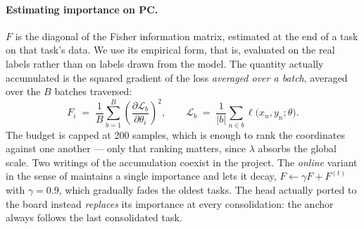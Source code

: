 \paragraph{Estimating importance on PC.} $F$ is the diagonal of the Fisher information matrix,
estimated at the end of a task on that task's data. We use its empirical form, that is, evaluated on
the real labels rather than on labels drawn from the model. The quantity actually accumulated is the
squared gradient of the loss \emph{averaged over a batch}, averaged over the $B$ batches traversed:
\begin{equation}
\label{eq:fisher}
F_i \;=\; \frac{1}{B} \sum_{b=1}^{B}
\left( \frac{\partial \mathcal{L}_b}{\partial \theta_i} \right)^{\!2},
\qquad
\mathcal{L}_b \;=\; \frac{1}{|b|} \sum_{n \in b} \ell\bigl(x_n, y_n; \theta\bigr) .
\end{equation}
The budget is capped at \num{200} samples, which is enough to rank the coordinates against one
another --- only that ranking matters, since $\lambda$ absorbs the global scale. Two writings of the
accumulation coexist in the project. The \emph{online} variant in the sense of
\cite{Schwarz2018Online} maintains a single importance and lets it decay, $F \leftarrow \gamma F +
F^{(t)}$ with $\gamma = \num{0.9}$, which gradually fades the oldest tasks. The head actually ported
to the board instead \emph{replaces} its importance at every consolidation: the anchor always follows
the last consolidated task.

